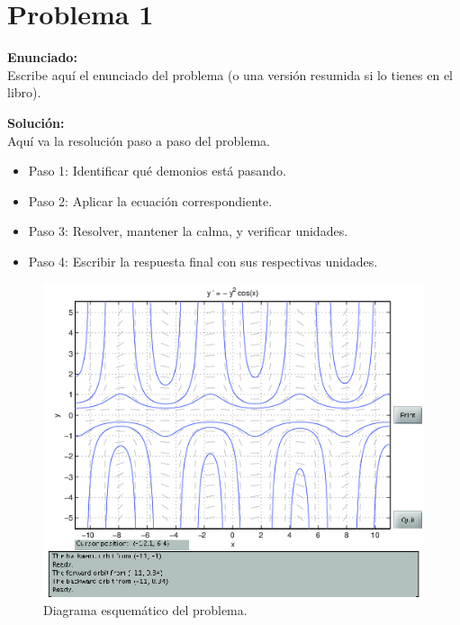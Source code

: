\documentclass[10pt,a4paper]{article}
\begin{document}
\vspace{1em}

\section*{Problema 1}
\textbf{Enunciado:} \\
Escribe aquí el enunciado del problema (o una versión resumida si lo tienes en el libro).

\vspace{1em}
\textbf{Solución:} \\

Aquí va la resolución paso a paso del problema.

\begin{itemize}
  \item Paso 1: Identificar qué demonios está pasando.
  \item Paso 2: Aplicar la ecuación correspondiente.
  \item Paso 3: Resolver, mantener la calma, y verificar unidades.
  \item Paso 4: Escribir la respuesta final con sus respectivas unidades.
\end{itemize}

\begin{figure}[h]
\centering
\includegraphics[width=1\textwidth,height=.45\textheight]{fig1.png}
\caption{Diagrama esquemático del problema.}
\end{figure}
\end{document}
